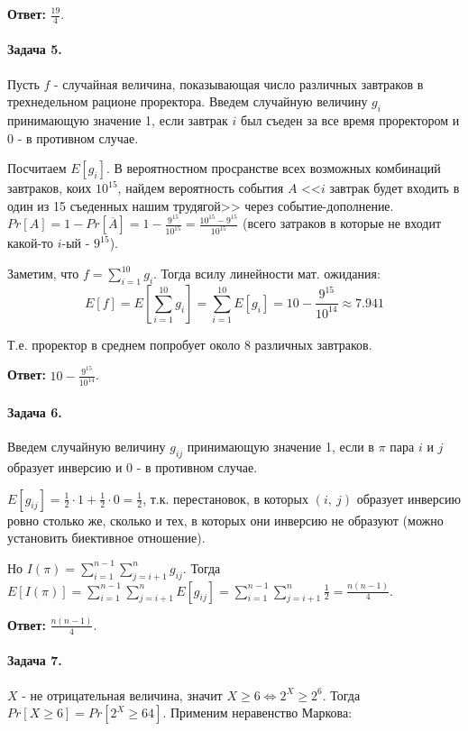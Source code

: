 \documentclass{article}
\newcommand{\pair}[2]{(#1,\ #2)}
\newcommand{\half}[1]{\frac{#1}{2}}
\begin{document}
    \textbf{Ответ:} $\frac{19}{4}$.

    \paragraph{Задача 5.}
    Пусть $f$ - случайная величина, показывающая число различных завтраков в трехнедельном рационе проректора. Введем случайную величину $g_i$ принимающую значение 1, если завтрак $i$ был съеден за все время проректором и 0 - в противном случае.

    Посчитаем $E[g_i]$. В вероятностном просранстве всех возможных комбинаций завтраков, коих $10^{15}$, найдем вероятность события $A$ <<$i$ завтрак будет входить в один из 15 съеденных нашим трудягой>> через событие-дополнение. $Pr[A] = 1 - Pr[\overline{A}] = 1 - \frac{9^{15}}{10^{15}} = \frac{10^{15} - 9^{15}}{10^{15}}$ (всего затраков в которые не входит какой-то $i$-ый - $9^{15}$).

    Заметим, что $f = \sum_{i=1}^{10}g_i$. Тогда всилу линейности мат. ожидания:
    $$ E[f] = 
    E[\sum_{i=1}^{10} g_i] = \sum_{i=1}^{10} E[g_i] = 10 - \frac{9^{15}}{10^{14}} \approx 7.941 $$

    Т.е. проректор в среднем попробует около 8 различных завтраков.

    \textbf{Ответ:} $10 - \frac{9^{15}}{10^{14}}$.


    \paragraph{Задача 6.}
    Введем случайную величину $g_{ij}$ принимающую значение 1, если в $\pi$
    пара $i$ и $j$ образует инверсию и 0 - в противном случае.

    $E[g_{ij}] = \frac{1}{2} \cdot 1 + \frac{1}{2} \cdot 0 = \half{1}$, т.к. перестановок, в которых $\pair{i}{j}$ образует инверсию ровно столько же, сколько и тех, в которых они инверсию не образуют (можно установить биективное отношение).

    Но $I({\pi}) = \sum_{i=1}^{n - 1}\sum_{j=i + 1}^{n}g_{ij}$. Тогда 
    $E[I(\pi)] = \sum_{i=1}^{n - 1}\sum_{j=i + 1}^{n}E[g_{ij}] 
    = \sum_{i=1}^{n - 1}\sum_{j=i + 1}^{n} \half{1} = \frac{n(n-1)}{4}$.

    \textbf{Ответ:} $\frac{n(n-1)}{4}$.

    \paragraph{Задача 7.}
    $X$ - не отрицательная величина, значит $X \ge 6 \Leftrightarrow 2^X \ge 2^6.$ Тогда $Pr[X \ge 6] = Pr[2^X \ge 64]$. Применим неравенство Маркова:
\end{document}
